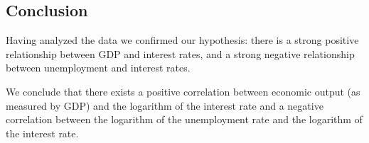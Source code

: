 \documentclass[12pt]{article}
\begin{document}
\subsection{Conclusion}
Having analyzed the data we confirmed our hypothesis: there is a strong positive relationship between GDP and interest rates, and a strong negative relationship between unemployment and interest rates.

We conclude that there exists a positive correlation between economic output (as measured by GDP) and the logarithm of the interest rate and a negative correlation between the logarithm of the unemployment rate and the logarithm of the interest rate. 
\end{document}
